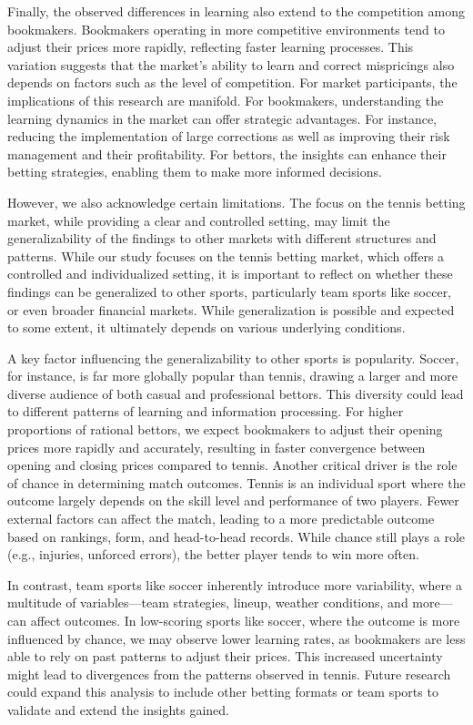 \documentclass[webpdf,modern,medium]{oup-authoring-template}
\theoremstyle{thmstyleone}%
\theoremstyle{thmstyletwo}%
\theoremstyle{thmstylethree}%
\begin{document}
    Finally, the observed differences in learning also extend to the competition among bookmakers. Bookmakers operating in more competitive environments tend to adjust their prices more rapidly, reflecting faster learning processes. This variation suggests that the market’s ability to learn and correct mispricings also depends on factors such as the level of competition.
    For market participants, the implications of this research are manifold. For bookmakers, understanding the learning dynamics in the market can offer strategic advantages. For instance, reducing the implementation of large corrections as well as improving their risk management and their profitability. For bettors, the insights can enhance their betting strategies, enabling them to make more informed decisions.

    However, we also acknowledge certain limitations. The focus on the tennis betting market, while providing a clear and controlled setting, may limit the generalizability of the findings to other markets with different structures and patterns.
    While our study focuses on the tennis betting market, which offers a controlled and individualized setting, it is important to reflect on whether these findings can be generalized to other sports, particularly team sports like soccer, or even broader financial markets. While generalization is possible and expected to some extent, it ultimately depends on various underlying conditions.

    A key factor influencing the generalizability to other sports is popularity. Soccer, for instance, is far more globally popular than tennis, drawing a larger and more diverse audience of both casual and professional bettors. This diversity could lead to different patterns of learning and information processing. For higher proportions of rational bettors, we expect bookmakers to adjust their opening prices more rapidly and accurately, resulting in faster convergence between opening and closing prices compared to tennis.
    Another critical driver is the role of chance in determining match outcomes.
    Tennis is an individual sport where the outcome largely depends on the skill level and performance of two players. Fewer external factors can affect the match, leading to a more predictable outcome based on rankings, form, and head-to-head records. While chance still plays a role (e.g., injuries, unforced errors), the better player tends to win more often.

    In contrast, team sports like soccer inherently introduce more variability, where a multitude of variables---team strategies, lineup, weather conditions, and more---can affect outcomes. In low-scoring sports like soccer, where the outcome is more influenced by chance, we may observe lower learning rates, as bookmakers are less able to rely on past patterns to adjust their prices. This increased uncertainty might lead to divergences from the patterns observed in tennis.
    Future research could expand this analysis to include other betting formats or team sports to validate and extend the insights gained.
\end{document}
